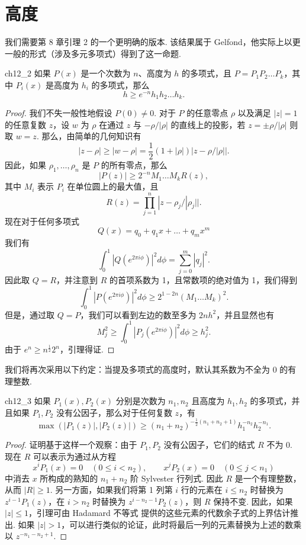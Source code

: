 \section{高度}

我们需要第 8 章引理 2 的一个更明确的版本. 该结果属于 Gelfond，他实际上以更一般的形式（涉及多元多项式）得到了这一命题.

\begin{mylemma}{}{ch12_2}
如果 $P(x)$ 是一个次数为 $n$、高度为 $h$ 的多项式，且 $P = P_1 P_2 \dots P_k$，其中 $P_i(x)$ 是高度为 $h_i$ 的多项式，那么
\[h \geqslant e^{-n} h_1 h_2 \dots h_k.\]
\end{mylemma}

\begin{proof}
我们不失一般性地假设 $P(0) \neq 0$. 对于 $P$ 的任意零点 $\rho$ 以及满足 $|z| = 1$ 的任意复数 $z$，设 $w$ 为 $\rho$ 在通过 $z$ 与 $-\rho/|\rho|$ 的直线上的投影，若 $z = \pm \rho/|\rho|$ 则取 $w = z$. 那么，由简单的几何知识有
\[|z-\rho| \ge |w-\rho| = \frac{1}{2}(1+|\rho|)|z-\rho/|\rho||.\]
因此，如果 $\rho_1, \ldots, \rho_n$ 是 $P$ 的所有零点，那么
\[|P(z)| \geqslant 2^{-n} M_1 \dots M_k R(z),\]
其中 $M_i$ 表示 $P_i$ 在单位圆上的最大值，且
\[R(z) = \prod_{j=1}^{n} |z - \rho_j/|\rho_j||.\]
现在对于任何多项式
\[Q(x) = q_0 + q_1 x + \dots + q_m x^m\]
我们有
\[\int_0^1 |Q(e^{2\pi i\phi})|^2 d\phi = \sum_{j=0}^m |q_j|^2.\]
因此取 $Q = R$，并注意到 $R$ 的首项系数为 1，且常数项的绝对值为 1，我们得到
\[\int_0^1 |P(e^{2\pi i\phi})|^2 d\phi \geqslant 2^{1-2n} (M_1 \dots M_k)^2.\]
但是，通过取 $Q = P$，我们可以看到左边的数至多为 $2nh^2$，并且显然也有
\[M_j^2 \geqslant \int_0^1 |P_j(e^{2\pi i\phi})|^2 d\phi \geqslant h_j^2.\]
由于 $e^n \ge n^{\frac{1}{2}} 2^n$，引理得证.
\end{proof}

我们将再次采用以下约定：当提及多项式的高度时，默认其系数为不全为 0 的有理整数.

\begin{mylemma}{}{ch12_3}
如果 $P_1(x), P_2(x)$ 分别是次数为 $n_1, n_2$ 且高度为 $h_1, h_2$ 的多项式，并且如果 $P_1, P_2$ 没有公因子，那么对于任何复数 $z$，有
\[\max(|P_1(z)|, |P_2(z)|) \ge (n_1 + n_2)^{-\frac{1}{2}(n_1 + n_2 + 1)} h_1^{-n_2} h_2^{-n_1}.\]
\end{mylemma}

\begin{proof}
证明基于这样一个观察：由于 $P_1, P_2$ 没有公因子，它们的结式 $R$ 不为 0. 现在 $R$ 可以表示为通过从方程
\[x^i P_1(x) = 0 \quad (0 \leqslant i < n_2), \qquad x^j P_2(x) = 0 \quad (0 \leqslant j < n_1)\]
中消去 $x$ 所构成的熟知的 $n_1 + n_2$ 阶 Sylvester 行列式. 因此 $R$ 是一个有理整数，从而 $|R| \ge 1$. 另一方面，如果我们将第 1 列第 $i$ 行的元素在 $i \le n_2$ 时替换为 $z^{i-1}P_1(z)$，在 $i > n_2$ 时替换为 $z^{i-n_2-1}P_2(z)$，则 $R$ 保持不变. 因此，如果 $|z| \le 1$，引理可由 Hadamard 不等式 提供的这些元素的代数余子式的上界估计推出. 如果 $|z| > 1$，可以进行类似的论证，此时将最后一列的元素替换为上述的数乘以 $z^{-n_1-n_2+1}$.
\end{proof}

